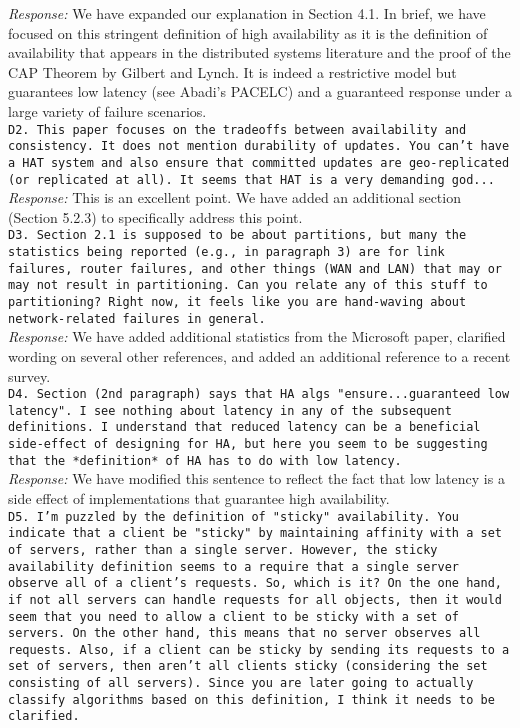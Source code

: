 \documentclass[10pt]{article}
\newcommand{\reviewer}[1] {\noindent\texttt{#1}\\}
\newcommand{\response}[1] {\noindent\textit{Response: } #1\\}
\begin{document}
\response{We have expanded our explanation in Section 4.1. In brief, we have
focused on this stringent definition of high availability as it is the
definition of availability that appears in the distributed systems
literature and the proof of the CAP Theorem by Gilbert and Lynch. It
is indeed a restrictive model but guarantees low latency (see Abadi's
PACELC) and a guaranteed response under a large variety of failure
scenarios.}

\reviewer{D2. This paper focuses on the tradeoffs between availability and consistency. It does not mention durability of updates. You can't have a HAT system and also ensure that committed updates are geo-replicated (or replicated at all). It seems that HAT is a very demanding god... }

\response{This is an excellent point. We have added an additional section (Section
5.2.3) to specifically address this point.}

\reviewer{D3. Section 2.1 is supposed to be about partitions, but many the
statistics being reported (e.g., in paragraph 3) are for link
failures, router failures, and other things (WAN and LAN) that may or
may not result in partitioning. Can you relate any of this stuff to
partitioning? Right now, it feels like you are hand-waving about
network-related failures in general.}

\response{We have added additional
statistics from the Microsoft paper, clarified wording on several
other references, and added an additional reference to a recent
survey.}

\reviewer{D4. Section (2nd paragraph) says that HA algs "ensure...guaranteed low latency". I see nothing about latency in any of the subsequent definitions. I understand that reduced latency can be a beneficial side-effect of designing for HA, but here you seem to be suggesting that the *definition* of HA has to do with low latency.}

\response{We have modified this sentence to reflect the fact that low latency is
a side effect of implementations that guarantee high availability.}

\reviewer{D5. I'm puzzled by the definition of "sticky" availability. You indicate that a client be "sticky" by maintaining affinity with a set of servers, rather than a single server. However, the sticky availability definition seems to a require that a single server observe all of a client's requests. So, which is it? On the one hand, if not all servers can handle requests for all objects, then it would seem that you need to allow a client to be sticky with a set of servers. On the other hand, this means that no server observes all requests. Also, if a client can be sticky by sending its requests to a set of servers, then aren't all clients sticky (considering the set consisting of all servers). Since you are later going to actually classify algorithms based on this definition, I think it needs to be clarified.}
\end{document}
